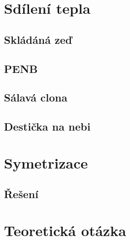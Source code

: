 \documentclass{article}
\begin{document}
\maketitle
\tableofcontents
\newpage




\section{Sdílení tepla}

\subsection{Skládáná zeď}

\subsection{PENB}

\subsection{Sálavá clona}

\subsection{Destička na nebi}




\section{Symetrizace}




\subsection{Řešení}





\section{Teoretická otázka}
\end{document}
